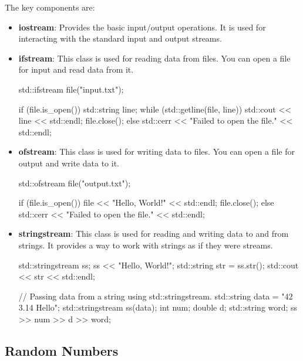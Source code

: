 The key components are:
\begin{itemize}
    \item \textbf{iostream}: Provides the basic input/output operations. It is used for interacting with the standard input and output streams.
    \item \textbf{ifstream}: This class is used for reading data from files. You can open a file for input and
    read data from it.
    \begin{codeblock}[language=C++]
        std::ifstream file("input.txt");

        if (file.is_open()) {
            std::string line;
            while (std::getline(file, line)) {
                std::cout << line << std::endl;
            }
            file.close();
        } else {
            std::cerr << "Failed to open the file." << std::endl;
        }
    \end{codeblock}
    \item \textbf{ofstream}: This class is used for writing data to files. You can open a file for output and write data to it.
    \begin{codeblock}[language=C++]
        std::ofstream file("output.txt");

        if (file.is_open()) {
            file << "Hello, World!" << std::endl;
            file.close();
        } else {
            std::cerr << "Failed to open the file." << std::endl;
        }
    \end{codeblock}
    \item \textbf{stringstream}: This class is used for reading and writing data to and from strings. It provides a way to work with strings as if they were streams.
    \begin{codeblock}[language=C++]
        std::stringstream ss;
        ss << "Hello, World!";
        std::string str = ss.str();
        std::cout << str << std::endl;

        // Passing data from a string using std::stringstream.
        std::string data = "42 3.14 Hello";
        std::stringstream ss(data);
        int num;
        double d;
        std::string word;
        ss >> num >> d >> word;
    \end{codeblock}
\end{itemize}

\subsection{Random Numbers}

